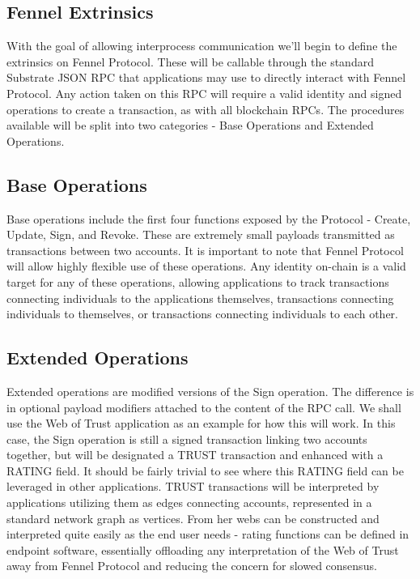 \documentclass[]{article}
\begin{document}
\subsection{Fennel Extrinsics}
\label{scrivauto:25}

With the goal of allowing interprocess communication we'll begin to define the extrinsics on Fennel Protocol. These will be callable through the standard Substrate JSON RPC that applications may use to directly interact with Fennel Protocol. Any action taken on this RPC will require a valid identity and signed operations to create a transaction, as with all blockchain RPCs. The procedures available will be split into two categories - Base Operations and Extended Operations.

\subsection{Base Operations}
\label{scrivauto:26}

Base operations include the first four functions exposed by the Protocol - Create, Update, Sign, and Revoke. These are extremely small payloads transmitted as transactions between two accounts.
It is important to note that Fennel Protocol will allow highly flexible use of these operations. Any identity on-chain is a valid target for any of these operations, allowing applications to track transactions connecting individuals to the applications themselves, transactions connecting individuals to themselves, or transactions connecting individuals to each other. 

\subsection{Extended Operations}
\label{scrivauto:27}

Extended operations are modified versions of the Sign operation. The difference is in optional payload modifiers attached to the content of the RPC call.
We shall use the Web of Trust application as an example for how this will work. In this case, the Sign operation is still a signed transaction linking two accounts together, but will be designated a TRUST transaction and enhanced with a RATING field. It should be fairly trivial to see where this RATING field can be leveraged in other applications. TRUST transactions will be interpreted by applications utilizing them as edges connecting accounts, represented in a standard network graph as vertices. From her webs can be constructed and interpreted quite easily as the end user needs - rating functions can be defined in endpoint software, essentially offloading any interpretation of the Web of Trust away from Fennel Protocol and reducing the concern for slowed consensus.
\end{document}
